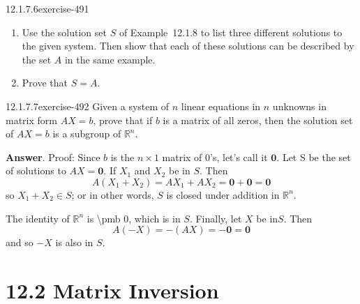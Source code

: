 \documentclass[twoside,10pt,]{book}
\numberwithin{equation}{section}
\begin{document}
\begin{divisionsolution}{12.1.7.6}{}{exercise-491}%
\hypertarget{p-4413}{}%
\leavevmode%
\begin{enumerate}[label=(\alph*)]
\item\hypertarget{li-2028}{}\hypertarget{p-4414}{}%
Use the solution set \(S\) of Example~12.1.8 to list three different solutions to the given system. Then show that each of these solutions can be described by the set \(A\) in the same example.%
\item\hypertarget{li-2029}{}\hypertarget{p-4415}{}%
Prove that \(S = A\).%
\end{enumerate}
%
\end{divisionsolution}%
\begin{divisionsolution}{12.1.7.7}{}{exercise-492}%
\hypertarget{p-4416}{}%
Given a system of \(n\) linear equations in \(n\) unknowns in matrix form \(A X = b\), prove that if \(b\) is a matrix of all zeros, then the solution set of \(A X = b\) is a subgroup of \(\mathbb{R}^n\).%
\par\smallskip%
\noindent\textbf{Answer}.\quad%
\hypertarget{p-4417}{}%
Proof: Since \(b\) is the \(n\times 1\) matrix of 0\textbraceleft{}'\textbraceright{}s, let's call it \(\pmb{0}\).  Let S be the set of solutions to \(A X = \pmb{0}\). If \(X_1\) and \(X_2\)  be in \(S\).  Then%
\begin{equation*}
A\left(X_1 + X_2 \right) = A X_1 + A X_2 = \pmb{0} + \pmb{0} = \pmb{0}
\end{equation*}
so \(X_1+ X_2 \in  S\); or in other words, \(S\) is closed under addition in \(\mathbb{R}^n\).%
\par
\hypertarget{p-4418}{}%
The identity of \(\mathbb{R}^n\) is \textbackslash{}pmb\textbraceleft{} 0\textbraceright{}, which is in \(S\).  Finally, let \(X\) be in\(S\). Then%
\begin{equation*}
A(-X) = -(A X) = - \pmb{0} = \pmb{0}
\end{equation*}
and so \(-X\) is also in \(S\).%
\end{divisionsolution}%
\section*{12.2 Matrix Inversion}
\end{document}
